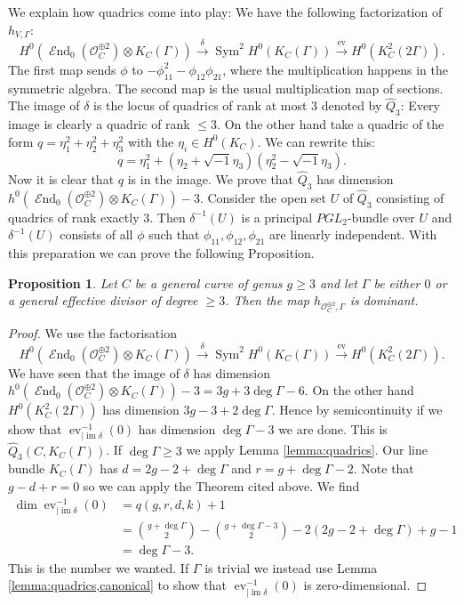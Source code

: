 \documentclass[12pt]{extarticle}
\newtheorem{proposition}[theorem]{Proposition}
\theoremstyle{definition}
\numberwithin{theorem}{section}
\newcommand{\OO}{\mathcal{O}}
\newcommand{\op}{\operatorname}
\DeclareMathOperator{\End}{\mathcal{E}nd}
\begin{document}
We explain how quadrics come into play: We have the following factorization of $h_{V,\Gamma}$:
 \begin{equation}\label{eq:factorization}
H^0(\End_0(\OO_C^{\oplus 2})\otimes K_C(\Gamma)) \xrightarrow{\delta} \op{Sym}^2H^0(K_C(\Gamma)) \xrightarrow{\op{ev}} H^0(K_C^2(2\Gamma)).
\end{equation}
The first map sends $\phi$ to $-\phi_{11}^2 - \phi_{12}\phi_{21}$, where the multiplication happens in the symmetric algebra. The second map is the usual multiplication map of sections. The image of $\delta$ is the locus of quadrics of rank at most $3$ denoted by $\hat{Q}_3$: Every image is clearly a quadric of rank $\leq 3$. On the other hand take a quadric of the form $q = \eta_1^2 + \eta_2^2 + \eta_3^2$ with the $\eta_i \in H^0(K_C)$. We can rewrite this:
\begin{equation*}
q = \eta_1^2 + (\eta_2 + \sqrt{-1}\eta_3)(\eta_2^2 - \sqrt{-1}\eta_3).
\end{equation*}   
Now it is clear that $q$ is in the image. We prove that $\hat{Q}_3$ has dimension $h^0(\End_0(\OO_C^{\oplus 2})\otimes K_C(\Gamma)) - 3$. Consider the open set $U$ of $\hat{Q}_3$ consisting of quadrics of rank exactly $3$. Then $\delta^{-1}(U)$ is a principal $PGL_2$-bundle over $U$ and $\delta^{-1}(U)$ consists of all $\phi$ such that $\phi_{11},\phi_{12}, \phi_{21}$ are linearly independent. With this preparation we can prove the following Proposition.
\begin{proposition}\label{prop:trivial_bundle_mer}
Let $C$ be a general curve of genus $g\geq 3$ and let $\Gamma$ be either $0$ or a general effective divisor of degree $\geq 3$. Then the map $h_{\OO_C^{\oplus 2},\Gamma}$ is dominant.  
\end{proposition} 
\begin{proof}
We use the factorisation \begin{equation*}
H^0(\End_0(\OO_C^{\oplus 2})\otimes K_C(\Gamma)) \xrightarrow{\delta} \op{Sym}^2H^0(K_C(\Gamma)) \xrightarrow{\op{ev}} H^0(K_C^2(2\Gamma)).
\end{equation*}
We have seen that the image of $\delta$ has dimension $h^0(\End_0(\OO_C^{\oplus 2})\otimes K_C(\Gamma)) - 3 = 3g + 3\deg \Gamma - 6$. On the other hand $H^0(K_C^2(2\Gamma))$ has dimension $3g -3 + 2\deg \Gamma$. Hence by semicontinuity if we show that $\op{ev}_{|\op{im}\delta}^{-1}(0)$ has dimension $\deg \Gamma -3$ we are done. This is $\hat{Q}_3(C,K_C(\Gamma))$. If $\deg \Gamma \geq 3$ we apply Lemma \ref{lemma:quadrics}. Our line bundle $K_C(\Gamma)$ has $d = 2g- 2 + \deg \Gamma$ and $r = g + \deg \Gamma -2$. Note that $g- d+ r = 0$ so we can apply the Theorem cited above. We find 
\begin{align*}
\dim \op{ev}_{|\op{im}\delta}^{-1}(0) &= q(g,r,d,k) +1 \\&= \binom{g+\deg \Gamma}{2} - \binom{g+\deg \Gamma -3}{2} - 2(2g-2 + \deg \Gamma) + g -1\\
& = \deg \Gamma -3.
\end{align*}
This is the number we wanted. If $\Gamma$ is trivial we instead use Lemma \ref{lemma:quadrics,canonical} to show that $\op{ev}^{-1}_{|\op{im}\delta}(0)$ is zero-dimensional.
\end{proof}
\end{document}
